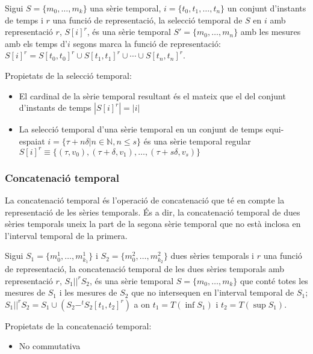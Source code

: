 \begin{definition}
  Sigui $S=\{m_0, \ldots, m_k\}$ una sèrie temporal,
  $i=\{t_0,t_1,\dotsc,t_n\}$ un conjunt d'instants de temps i $r$ una
  funció de representació, la selecció temporal de $S$ en $i$ amb
  representació $r$, $S[i]^r$, és una sèrie temporal $S'=\{m_0, \ldots, m_n\}$
  amb les mesures amb els temps d'$i$ segons marca la funció de
  representació: $S[i]^r= S[t_0,t_0]^r \cup S[t_1,t_1]^r \cup \dotsb
  \cup S[t_n,t_n]^r$.
\end{definition}

Propietats de la selecció temporal:
\begin{itemize}

\item El cardinal de la sèrie temporal resultant és el mateix que el
  del conjunt d'instants de temps $|S[i]^r| = |i|$

\item La selecció temporal d'una sèrie temporal en un conjunt de temps
  equi-espaiat $i = \{\tau+n\delta | n\in\mathbb{N}, n\leq s \}$ és una
  sèrie temporal regular $S[i]^r \equiv \{ (\tau, v_0),
  (\tau+\delta,v_1), \dotsc , (\tau+s\delta,v_s)\}$
\end{itemize}




\subsubsection{Concatenació temporal}

La concatenació temporal és l'operació de concatenació que té en
compte la representació de les sèries temporals.  És a dir, la
concatenació temporal de dues sèries temporals uneix la part de la
segona sèrie temporal que no està inclosa en l'interval temporal de la
primera.


\begin{definition}
  Sigui $S_1=\{m_0^1, \dotsc, m_{k_1}^1\}$ i $S_2=\{m_0^2, \dotsc,
  m_{k_2}^2\}$ dues sèries temporals i $r$ una funció de
  representació, la concatenació temporal de les dues sèries temporals
  amb representació $r$, $S_1 ||^r S_2$, és una sèrie temporal $S=\{m_0,
  \dotsc, m_k\}$ que conté totes les mesures de $S_1$ i les mesures de
  $S_2$ que no intersequen en l'interval temporal de $S_1$; $S_1 ||^r
  S_2 = S_1 \cup ( S_2 -^t S_2[t_1,t_2]^r )$ a on $t_1=T(\inf S_1)$ i
  $t_2=T(\sup S_1)$.
\end{definition}

Propietats de la concatenació temporal:
\begin{itemize}
\item No commutativa
\end{itemize}




